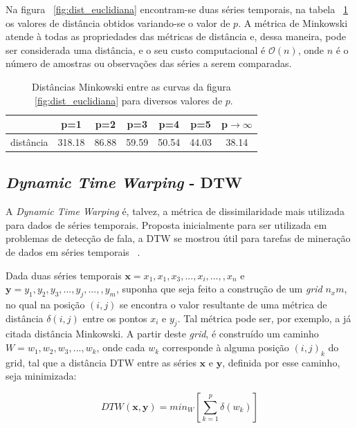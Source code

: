 Na figura ~\ref{fig:dist_euclidiana} encontram-se duas séries temporais, na tabela ~\ref{minkowski_table} os valores de distância obtidos variando-se o valor de $p$. A métrica de Minkowski atende à todas as propriedades das métricas de distância e, dessa maneira, pode ser considerada uma distância, e o seu custo computacional é $\mathcal{O}(n)$, onde $n$ é o número de amostras ou observações das séries a serem comparadas.


\begin{table}[]
	\centering
	\caption{Distâncias Minkowski entre as curvas da figura ~\ref{fig:dist_euclidiana} para diversos valores de $p$.}
	\label{minkowski_table}
	\begin{tabular}{|c|c|c|c|c|c|c|}
		\hline
						& p=1    & p=2   & p=3   & p=4 &p=5 & p$\to \infty$ \\ \hline
		distância & 318.18 & 86.88 & 59.59 & 50.54 & 44.03 & 38.14   \\ \hline
	\end{tabular}
\end{table}


\subsection{\emph{Dynamic Time Warping} - DTW}

A \emph{Dynamic Time Warping} é, talvez, a métrica de dissimilaridade mais utilizada para dados de séries temporais. Proposta inicialmente para ser utilizada em problemas de detecção de fala, a DTW se mostrou útil para tarefas de mineração de dados em séries temporais ~\parencite{DTW}.

Dada duas séries temporais $\bm{x} = x_1,x_1,x_3,...,x_i,...,,x_n$ e $\bm{y} = y_1,y_2,y_3,...,y_j,...,,y_m$, suponha que seja feito a construção de um \emph{grid} $n_{x}m$, no qual na posição $(i,j)$ se encontra o valor resultante de uma métrica de distância $\delta(i,j)$ entre os pontos $x_i$ e $y_j$. Tal métrica pode ser, por exemplo, a já citada distância Minkowski. A partir deste \emph{grid}, é construído um caminho $W=w_1,w_2,w_3,...,w_k$, onde cada $w_k$ corresponde à alguma posição $(i,j)_k$ do grid, tal que a distância DTW entre as séries $\bm{x}$ e $\bm{y}$, definida por esse caminho, seja minimizada:

\begin{equation}
DTW(\bm{x},\bm{y}) = min_W[\sum_{k=1}^{p}\delta(w_k)]
\end{equation}

